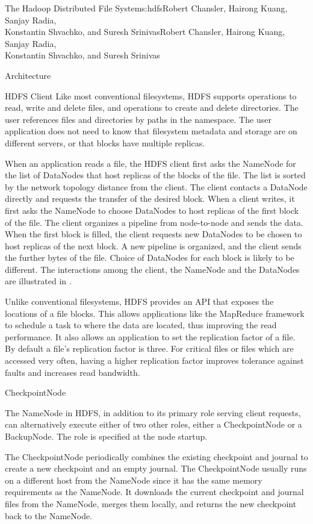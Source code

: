 \begin{aosachaptertoc}{The Hadoop Distributed File System}{s:hdfs}{Robert Chansler, Hairong Kuang, Sanjay Radia, \\ Konstantin Shvachko, and Suresh Srinivas}{Robert Chansler, Hairong Kuang, Sanjay Radia, \\ \hspace*{0.9cm} Konstantin Shvachko, and Suresh Srinivas}
\begin{aosasect1}{Architecture}
\begin{aosasect2}{HDFS Client}
Like most conventional filesystems, HDFS supports operations to read,
write and delete files, and operations to create and delete
directories. The user references files and directories by paths in the
namespace. The user application does not need to know that filesystem
metadata and storage are on different servers, or that blocks have
multiple replicas.

When an application reads a file, the HDFS client first asks the
NameNode for the list of DataNodes that host replicas of the blocks of
the file. The list is sorted by the network topology distance from the client. The client
contacts a DataNode directly and requests the
transfer of the desired block. When a client writes, it first asks the
NameNode to choose DataNodes to host replicas of the first block of
the file. The client organizes a pipeline from node-to-node and sends
the data. When the first block is filled, the client requests new
DataNodes to be chosen to host replicas of the next block. A new
pipeline is organized, and the client sends the further bytes of the
file. Choice of DataNodes for each block is likely to be
different. The interactions among the client, the NameNode and the
DataNodes are illustrated in .


Unlike conventional filesystems, HDFS provides an API that exposes
the locations of a file blocks.  This allows applications like the
MapReduce framework to schedule a task to where the data are located,
thus improving the read performance. It also allows an application to
set the replication factor of a file. By default a file's replication
factor is three. For critical files or files which are accessed very
often, having a higher replication factor improves tolerance against
faults and increases read bandwidth.

\end{aosasect2}

\begin{aosasect2}{CheckpointNode}

The NameNode in HDFS, in addition to its primary role serving client
requests, can alternatively execute either of two other roles, either
a CheckpointNode or a BackupNode. The role is specified at the node
startup.

The CheckpointNode periodically combines the existing checkpoint and
journal to create a new checkpoint and an empty journal. The
CheckpointNode usually runs on a different host from the NameNode
since it has the same memory requirements as the NameNode. It
downloads the current checkpoint and journal files from the NameNode,
merges them locally, and returns the new checkpoint back to the
NameNode.


\end{aosasect2}
\end{aosasect1}
\end{aosachaptertoc}
